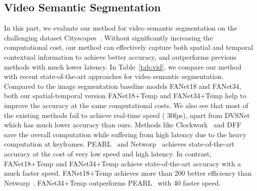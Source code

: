 \subsection{Video Semantic Segmentation}
In this part, we evaluate our method for video semantic segmentation on the challenging dataset Cityscapes~\cite{cordts2016cityscapes}. Without significantly increasing the computational cost, our method can effectively capture both spatial and temporal contextual information to achieve better accuracy, and outperforms previous methods with much lower latency.  In Table~\ref{tab:vid}, we compare our method with recent state-of-the-art approaches for video semantic segmentation. 
Compared to the image segmentation baseline models FANet18 and FANet34, both our spatial-temporal version FANet18+Temp and FANet34+Temp help to improve the accuracy at the same computational costs.
We also see that most of the existing methods fail to achieve real-time speed ( 30fps), apart from DVSNet which has much lower accuracy than ours.
Methods like Clockwork~\cite{shelhamer2016clockwork} and DFF~\cite{zhu17dff} save the overall computation while suffering from high latency due to the heavy computation at keyframes. PEARL~\cite{jin2017video} and Networp~\cite{gadde2017semantic} achieves state-of-the-art accuracy at the cost of very low speed and high latency. 
In contrast, FANet18+Temp and FANet34+Temp achieve state-of-the-art accuracy with a much faster speed. FANet18+Temp achieves more than 200 better efficiency than Netwarp~\cite{gadde2017semantic}. FANet34+Temp outperforms PEARL~\cite{jin2017video} with 40 faster speed. 






